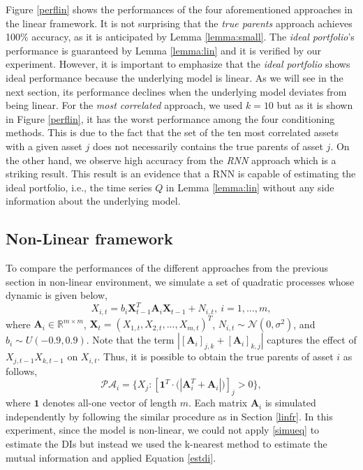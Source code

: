 Figure \ref{perflin} shows the performances of the four aforementioned approaches in the linear framework. 
It is not surprising that the \textit{true parents} approach achieves 100\% accuracy, as it is anticipated by Lemma \ref{lemma:small}.
The \textit{ideal portfolio}'s performance is guaranteed by Lemma \ref{lemma:lin} and it is verified by our experiment.
However, it is important to emphasize that the \textit{ideal portfolio} shows ideal performance because the underlying model is linear. 
As we will see in the next section, its performance declines when the underlying model deviates from being linear. 
For the \textit{most correlated} approach, we used $k=10$ but as it is shown in Figure \ref{perflin}, it has the worst performance among the four conditioning methods. 
This is due to the fact that the set of the ten most correlated assets with a given asset $j$ does not necessarily contains the true parents of asset $j$.
On the other hand, we observe high accuracy from the \textit{RNN} approach which is a striking result.
This result is an evidence that a RNN is capable of estimating the ideal portfolio, i.e., the time series $Q$ in Lemma \ref{lemma:lin} without any side information about the underlying model. 





\subsection{Non-Linear framework} \label{nonlinfr}
To compare the performances of the different approaches from the previous section in non-linear environment, we simulate a set of quadratic processes whose dynamic is given below, 
\begin{equation}\label{eq:ex_non}
        X_{i,t} =b_i  {\textbf{X}^T_{t-1}} \textbf{A}_i \textbf{X}_{t-1} + N_{i,t}, \ i=1,...,m,
\end{equation}
where $\textbf{A}_i\in\mathbb{R}^{m \times m}$, $\textbf{X}_t = (X_{1,t}, X_{2,t},..., X_{m,t})^T$, $N_{i,t}\sim\mathcal{N}(0,\sigma^2)$, and $b_i\sim U(-0.9 , 0.9)$.
Note that the term $|[\textbf{A}_i]_{j,k} + [\textbf{A}_i]_{k,j}|$ captures the effect of $X_{j,t-1}X_{k,t-1}$ on $X_{i,t}$. Thus, it is possible to obtain the true parents of asset $i$ as follows,
\begin{equation}
 \mathcal{PA}_i = \{ X_j :  [\textbf{1}^T \cdot \big(|\textbf{A}^T_i + \textbf{A}_i|\big)]_{j}  > 0\},
\end{equation}
where $\textbf{1}$ denotes all-one vector of length $m$.
Each matrix $\textbf{A}_i$ is simulated independently by following the similar procedure as in Section \ref{linfr}.
In this experiment, since the model is non-linear, we could not apply \eqref{simueq} to estimate the DIs but instead we used the k-nearest method to estimate the mutual information and applied Equation \eqref{estdi}.



